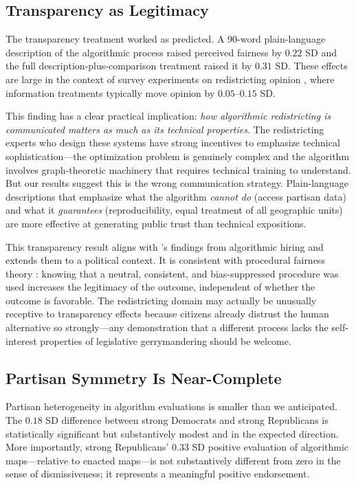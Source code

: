 \subsection{Transparency as Legitimacy}

The transparency treatment worked as predicted. A 90-word plain-language description of the algorithmic process raised perceived fairness by $0.22$ SD and the full description-plus-comparison treatment raised it by $0.31$ SD. These effects are large in the context of survey experiments on redistricting opinion \citep{bonneau2021,elmendorf2019}, where information treatments typically move opinion by $0.05$--$0.15$ SD.

This finding has a clear practical implication: \textit{how algorithmic redistricting is communicated matters as much as its technical properties}. The redistricting experts who design these systems have strong incentives to emphasize technical sophistication---the optimization problem is genuinely complex and the algorithm involves graph-theoretic machinery that requires technical training to understand. But our results suggest this is the wrong communication strategy. Plain-language descriptions that emphasize what the algorithm \textit{cannot do} (access partisan data) and what it \textit{guarantees} (reproducibility, equal treatment of all geographic units) are more effective at generating public trust than technical expositions.

This transparency result aligns with \citet{lee2018understanding}'s findings from algorithmic hiring and extends them to a political context. It is consistent with procedural fairness theory \citep{tyler2006legitimacy}: knowing that a neutral, consistent, and bias-suppressed procedure was used increases the legitimacy of the outcome, independent of whether the outcome is favorable. The redistricting domain may actually be unusually receptive to transparency effects because citizens already distrust the human alternative so strongly---any demonstration that a different process lacks the self-interest properties of legislative gerrymandering should be welcome.

\subsection{Partisan Symmetry Is Near-Complete}

Partisan heterogeneity in algorithm evaluations is smaller than we anticipated. The $0.18$ SD difference between strong Democrats and strong Republicans is statistically significant but substantively modest and in the expected direction. More importantly, strong Republicans' $0.33$ SD positive evaluation of algorithmic maps---relative to enacted maps---is not substantively different from zero in the sense of dismissiveness; it represents a meaningful positive endorsement.

